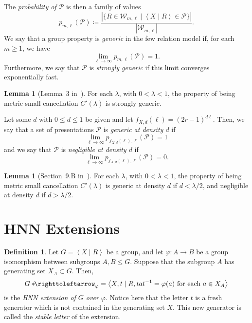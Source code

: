 \documentclass[11pt,a4paper,reqno]{amsart}
\theoremstyle{plain}
\theoremstyle{definition}
\newtheorem{lemma}[theorem]{Lemma}
\newtheorem{definition}[theorem]{Definition}
\theoremstyle{definition}
\renewcommand\leq\leqslant
\newcommand\hnn{*\!\!\righttoleftarrow}
\begin{document}
The \emph{probability of $\mathcal P$} is then a family of values
\[
	p_{m,\ell}(\mathcal P)
	\coloneq
	\frac{|\{ R\in\mathcal W_{m,\ell} \mid \left\langle X\mid R \right\rangle \in \mathcal P  \}|}{| \mathcal W_{m,\ell} |}.
\]
We say that a group property is \emph{generic} in the few relation model if, for each $m \geqslant 1$, we have
\[
	\lim_{\ell \to \infty} p_{m,\ell}(\mathcal{P}) = 1.
\]
Furthermore, we say that $\mathcal{P}$ is \emph{strongly generic} if this limit converges exponentially fast.

\begin{lemma}[Lemma~3 in~\cite{arzhantseva}]
	For each $\lambda$, with $0< \lambda<1$, the property of being metric small cancellation $C'(\lambda)$ is strongly generic.
\end{lemma}

Let some $d$ with $0 \leqslant d \leqslant 1$ be given and let $f_{X,d}(\ell) = (2r-1)^{d\ell}$.
Then, we say that a set of presentations $\mathcal{P}$ is \emph{generic at density $d$} if
\[
	\lim_{\ell \to \infty}
	p_{f_{X,d}(\ell),\ell}(\mathcal{P}) = 1
\]
and we say that $\mathcal{P}$ is \emph{negligible at density $d$} if
\[
	\lim_{\ell \to \infty}
	p_{f_{X,d}(\ell),\ell}(\mathcal{P}) = 0.
\]

\begin{lemma}[Section~9.B in~\cite{gromov_asymptotic}]
	For each $\lambda$, with $0 < \lambda < 1$, the property of being metric small cancellation $C'(\lambda)$ is generic at density $d$ if $d < \lambda/2$, and negligible at density $d$ if $d > \lambda/2$.
\end{lemma}

\section{HNN Extensions}

\begin{definition}\label{def:hnn-extension}
	Let $G = \left\langle X \mid R\right\rangle$ be a group, and let $\varphi\colon A\to B$ be a group isomorphism between subgroups $A,B\leq G$.
	Suppose that the subgroup $A$ has generating set $X_A \subset G$.
	Then,
	\[
		G\hnn_\varphi
		=
		\left\langle
		X, t
		\mid
		R, tat^{-1} = \varphi(a)\text{ for each } a\in X_A
		\right\rangle
	\]
	is the \emph{HNN extension of $G$ over $\varphi$}.
	Notice here that the letter $t$ is a fresh generator which is not contained in the generating set $X$.
	This new generator is called the \emph{stable letter} of the extension.
\end{definition}
\end{document}
